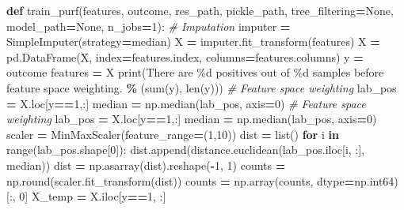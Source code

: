 \documentclass[
  11pt,
  oneside]{book}
\newenvironment{Shaded}{\begin{snugshade}}{\end{snugshade}}
\newcommand{\BuiltInTok}[1]{#1}
\newcommand{\CommentTok}[1]{\textcolor[rgb]{0.56,0.35,0.01}{\textit{#1}}}
\newcommand{\ControlFlowTok}[1]{\textcolor[rgb]{0.13,0.29,0.53}{\textbf{#1}}}
\newcommand{\DecValTok}[1]{\textcolor[rgb]{0.00,0.00,0.81}{#1}}
\newcommand{\KeywordTok}[1]{\textcolor[rgb]{0.13,0.29,0.53}{\textbf{#1}}}
\newcommand{\NormalTok}[1]{#1}
\newcommand{\OperatorTok}[1]{\textcolor[rgb]{0.81,0.36,0.00}{\textbf{#1}}}
\newcommand{\SpecialCharTok}[1]{\textcolor[rgb]{0.00,0.00,0.00}{#1}}
\newcommand{\StringTok}[1]{\textcolor[rgb]{0.31,0.60,0.02}{#1}}
\newcommand{\VariableTok}[1]{\textcolor[rgb]{0.00,0.00,0.00}{#1}}
\begin{document}
\begin{Shaded}
\begin{Highlighting}[]
\KeywordTok{def}\NormalTok{ train\_purf(features, outcome, res\_path, pickle\_path, tree\_filtering}\OperatorTok{=}\VariableTok{None}\NormalTok{, model\_path}\OperatorTok{=}\VariableTok{None}\NormalTok{, n\_jobs}\OperatorTok{=}\DecValTok{1}\NormalTok{):}
    \CommentTok{\# Imputation}
\NormalTok{    imputer }\OperatorTok{=}\NormalTok{ SimpleImputer(strategy}\OperatorTok{=}\StringTok{\textquotesingle{}median\textquotesingle{}}\NormalTok{)}
\NormalTok{    X }\OperatorTok{=}\NormalTok{ imputer.fit\_transform(features)}
\NormalTok{    X }\OperatorTok{=}\NormalTok{ pd.DataFrame(X, index}\OperatorTok{=}\NormalTok{features.index, columns}\OperatorTok{=}\NormalTok{features.columns)}
\NormalTok{    y }\OperatorTok{=}\NormalTok{ outcome}
\NormalTok{    features }\OperatorTok{=}\NormalTok{ X}
    \BuiltInTok{print}\NormalTok{(}\StringTok{\textquotesingle{}There are }\SpecialCharTok{\%d}\StringTok{ positives out of }\SpecialCharTok{\%d}\StringTok{ samples before feature space weighting.\textquotesingle{}} \OperatorTok{\%}\NormalTok{ (}\BuiltInTok{sum}\NormalTok{(y), }\BuiltInTok{len}\NormalTok{(y)))}
    \CommentTok{\# Feature space weighting}
\NormalTok{    lab\_pos }\OperatorTok{=}\NormalTok{ X.loc[y}\OperatorTok{==}\DecValTok{1}\NormalTok{,:]}
\NormalTok{    median }\OperatorTok{=}\NormalTok{ np.median(lab\_pos, axis}\OperatorTok{=}\DecValTok{0}\NormalTok{)}
    \CommentTok{\# Feature space weighting}
\NormalTok{    lab\_pos }\OperatorTok{=}\NormalTok{ X.loc[y}\OperatorTok{==}\DecValTok{1}\NormalTok{,:]}
\NormalTok{    median }\OperatorTok{=}\NormalTok{ np.median(lab\_pos, axis}\OperatorTok{=}\DecValTok{0}\NormalTok{)}
\NormalTok{    scaler }\OperatorTok{=}\NormalTok{ MinMaxScaler(feature\_range}\OperatorTok{=}\NormalTok{(}\DecValTok{1}\NormalTok{,}\DecValTok{10}\NormalTok{))}
\NormalTok{    dist }\OperatorTok{=} \BuiltInTok{list}\NormalTok{()}
    \ControlFlowTok{for}\NormalTok{ i }\KeywordTok{in} \BuiltInTok{range}\NormalTok{(lab\_pos.shape[}\DecValTok{0}\NormalTok{]):}
\NormalTok{        dist.append(distance.euclidean(lab\_pos.iloc[i, :], median))}
\NormalTok{    dist }\OperatorTok{=}\NormalTok{ np.asarray(dist).reshape(}\OperatorTok{{-}}\DecValTok{1}\NormalTok{, }\DecValTok{1}\NormalTok{)}
\NormalTok{    counts }\OperatorTok{=}\NormalTok{ np.}\BuiltInTok{round}\NormalTok{(scaler.fit\_transform(dist))}
\NormalTok{    counts }\OperatorTok{=}\NormalTok{ np.array(counts, dtype}\OperatorTok{=}\NormalTok{np.int64)[:, }\DecValTok{0}\NormalTok{]}
\NormalTok{    X\_temp }\OperatorTok{=}\NormalTok{ X.iloc[y}\OperatorTok{==}\DecValTok{1}\NormalTok{, :]}

\end{Highlighting}
\end{Shaded}
\end{document}
